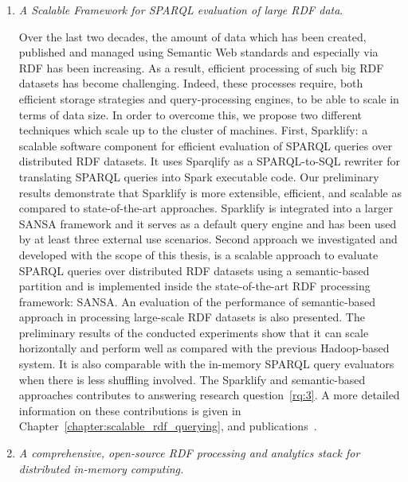 \begin{enumerate}
    \item \textit{A Scalable Framework for \gls{SPARQL} evaluation of large \gls{RDF} data}.
    
    Over the last two decades, the amount of data which has been created, published and managed using Semantic Web standards and especially via \gls{RDF} has been increasing.
    As a result, efficient processing of such big \gls{RDF} datasets has become challenging.
    Indeed, these processes require, both efficient storage strategies and query-processing engines, to be able to scale in terms of data size.
    In order to overcome this, we propose two different techniques which scale up to the cluster of machines.
    First, Sparklify: a scalable software component for efficient evaluation of \gls{SPARQL} queries over distributed \gls{RDF} datasets. It uses Sparqlify as a SPARQL-to-SQL rewriter for translating \gls{SPARQL} queries into Spark executable code.
    Our preliminary results demonstrate that Sparklify is more extensible, efficient, and scalable as compared to state-of-the-art approaches.
    Sparklify is integrated into a larger SANSA framework and it serves as a default query engine and has been used by at least three external use scenarios.
    Second approach we investigated and developed with the scope of this thesis, is a scalable approach to evaluate \gls{SPARQL} queries over distributed \gls{RDF} datasets using a semantic-based partition and is implemented inside the state-of-the-art \gls{RDF} processing framework: SANSA.
    An evaluation of the performance of semantic-based approach in processing large-scale \gls{RDF} datasets is also presented. 
    The preliminary results of the conducted experiments show that it can scale horizontally and perform well as compared with the previous Hadoop-based system.
    It is also comparable with the in-memory \gls{SPARQL} query evaluators when there is less shuffling involved.
    The Sparklify and semantic-based approaches contributes to answering research question~\ref{rq:3}.
    A more detailed information on these contributions is given in Chapter~\ref{chapter:scalable_rdf_querying}, and publications~\cite{2019-sansa-sparklify-iswc, sejdiu-2019-sansa-semantic-based-semantics, sansa-sparklify-ISWC-demo}.
    
    \item \textit{A comprehensive, open-source \gls{RDF} processing and analytics stack for distributed in-memory computing.} 
    

\end{enumerate}
